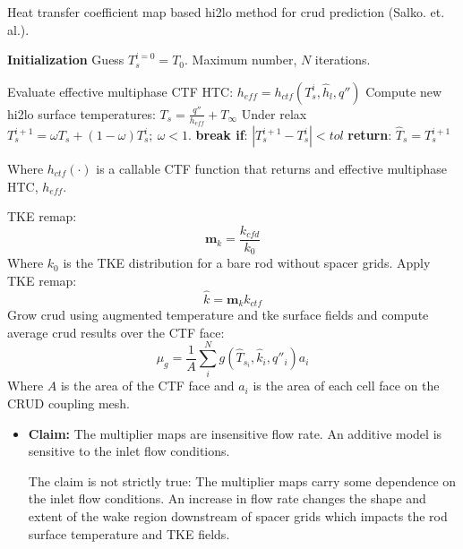 \begin{itemize}
    \begin{algorithm}[H]
        \caption{Heat transfer coefficient map based hi2lo method for crud prediction (Salko. et. al.).}
    \begin{algorithmic}
    \STATE \textbf{Initialization} 
    \STATE Guess $T^{i=0}_s=T_0$.  Maximum number, $N$ iterations.

           \STATE Evaluate effective multiphase CTF HTC: $h_{eff} = h_{{ctf}}(T^i_{s}, \hat h_l, q'')$ \;
           \STATE Compute new hi2lo surface temperatures: $T_{s} = \frac{q''}{h_{eff}} + T_\infty$ \;
           \STATE  Under relax  $T^{i+1}_{s} = \omega T_{s} + (1 - \omega) T^{i}_{s} ;\ \omega < 1.$ \;
           \STATE  \textbf{break if}:  $|T^{i+1}_s - T^i_s| < tol$ \;
        \ENDFOR 
    \STATE \textbf{return}: $\hat T_s = T^{i+1}_s$
    \end{algorithmic}
    \end{algorithm}
    Where $h_{ctf}(\cdot)$ is a callable CTF function that returns and effective multiphase HTC, $h_{eff}$.

    TKE remap:
    \begin{equation}
       \mathbf m_{k} = \frac{k_{cfd}}{k_{0}}
    \end{equation}
    Where $k_0$ is the TKE distribution for a bare rod without spacer grids.
    Apply TKE remap:
       \begin{equation}
       \hat k = \mathbf m_k k_{ctf}
       \end{equation}
     Grow crud using augmented temperature and tke surface fields and compute average crud results over the CTF face:
     \begin{equation}
     \mu_g = \frac{1}{A} \sum_i^N g(\hat T_{s_i}, \hat k_i, q''_i) a_i
     \end{equation}
    Where $A$ is the area of the CTF face and $a_i$ is the area of each cell face on the CRUD coupling mesh.

    \begin{itemize}
    \item \textbf{Claim:} The multiplier maps are insensitive flow rate.  An additive model is sensitive to the inlet flow conditions.

     The claim is not strictly true: The multiplier maps carry some dependence on the inlet flow conditions.  An increase in flow rate changes the shape and extent of the wake region downstream of spacer grids which impacts the rod surface temperature and TKE fields.


\end{itemize}
\end{itemize}
